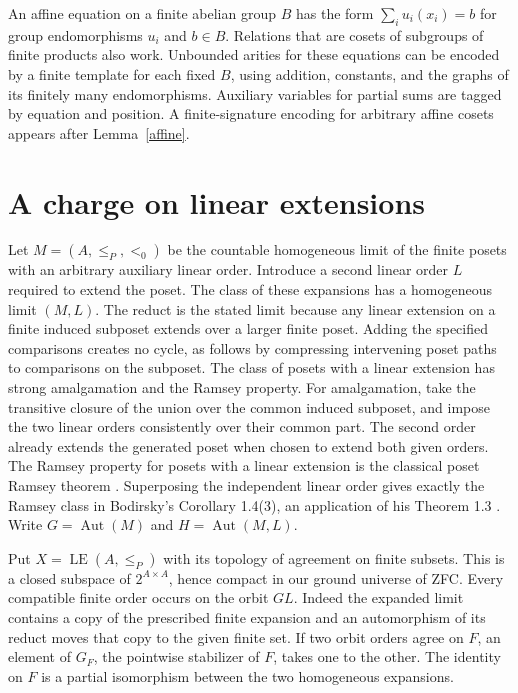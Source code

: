 \documentclass[11pt]{article}
\newcommand{\LE}{\operatorname{LE}}
\newcommand{\Aut}{\operatorname{Aut}}
\begin{document}
An affine equation on a finite abelian group $B$ has the form $\sum_i u_i(x_i)=b$ for group endomorphisms $u_i$ and $b\in B$. Relations that are cosets of subgroups of finite products also work. Unbounded arities for these equations can be encoded by a finite template for each fixed $B$, using addition, constants, and the graphs of its finitely many endomorphisms. Auxiliary variables for partial sums are tagged by equation and position. A finite-signature encoding for arbitrary affine cosets appears after Lemma~\ref{affine}.

\section{A charge on linear extensions}
Let $M=(A,\leq_P,<_{0})$ be the countable homogeneous limit of the finite posets with an arbitrary auxiliary linear order. Introduce a second linear order $L$ required to extend the poset. The class of these expansions has a homogeneous limit $(M,L)$. The reduct is the stated limit because any linear extension on a finite induced subposet extends over a larger finite poset. Adding the specified comparisons creates no cycle, as follows by compressing intervening poset paths to comparisons on the subposet. The class of posets with a linear extension has strong amalgamation and the Ramsey property. For amalgamation, take the transitive closure of the union over the common induced subposet, and impose the two linear orders consistently over their common part. The second order already extends the generated poset when chosen to extend both given orders. The Ramsey property for posets with a linear extension is the classical poset Ramsey theorem \cite{bod}. Superposing the independent linear order gives exactly the Ramsey class in Bodirsky's Corollary 1.4(3), an application of his Theorem 1.3 \cite{bod}. Write $G=\Aut(M)$ and $H=\Aut(M,L)$.

Put $X=\LE(A,\leq_P)$ with its topology of agreement on finite subsets. This is a closed subspace of $2^{A\times A}$, hence compact in our ground universe of ZFC. Every compatible finite order occurs on the orbit $G L$. Indeed the expanded limit contains a copy of the prescribed finite expansion and an automorphism of its reduct moves that copy to the given finite set. If two orbit orders agree on $F$, an element of $G_F$, the pointwise stabilizer of $F$, takes one to the other. The identity on $F$ is a partial isomorphism between the two homogeneous expansions.
\end{document}
